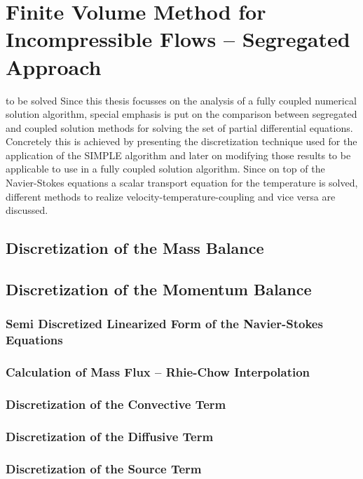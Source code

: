   \section{Finite Volume Method for Incompressible Flows -- Segregated Approach}
to be solved  Since this thesis focusses on the analysis of a fully coupled numerical solution algorithm, special emphasis is put on the comparison between segregated and coupled solution methods for solving the set of partial differential equations. Concretely this is achieved by presenting the discretization technique used for the application of the SIMPLE algorithm and later on modifying those results to be applicable to use in a fully coupled solution algorithm. Since on top of the Navier-Stokes equations a scalar transport equation for the temperature is solved, different methods to realize velocity-temperature-coupling and vice versa are discussed.

    \subsection{Discretization of the Mass Balance}

    \subsection{Discretization of the Momentum Balance}
      
      \subsubsection{Semi Discretized Linearized Form of the Navier-Stokes Equations}

      \subsubsection{Calculation of Mass Flux -- Rhie-Chow Interpolation}

      \subsubsection{Discretization of the Convective Term}

      \subsubsection{Discretization of the Diffusive Term}

      \subsubsection{Discretization of the Source Term}

